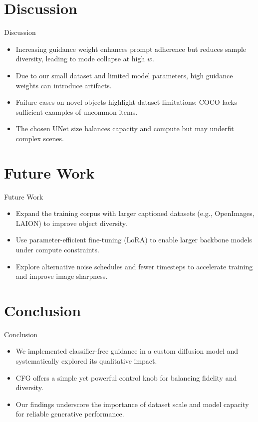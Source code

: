 \documentclass[11pt]{beamer}
\begin{document}
  \section{Discussion}
\begin{frame}{Discussion}
  \begin{itemize}
    \item Increasing guidance weight enhances prompt adherence but reduces sample diversity, leading to mode collapse at high $w$.
    \item Due to our small dataset and limited model parameters, high guidance weights can introduce artifacts.
    \item Failure cases on novel objects highlight dataset limitations: COCO lacks sufficient examples of uncommon items.
    \item The chosen UNet size balances capacity and compute but may underfit complex scenes.
  \end{itemize}
\end{frame}

\section{Future Work}
\begin{frame}{Future Work}
  \begin{itemize}
    \item Expand the training corpus with larger captioned datasets (e.g., OpenImages, LAION) to improve object diversity.
    \item Use parameter-efficient fine-tuning (LoRA) to enable larger backbone models under compute constraints.
    \item Explore alternative noise schedules and fewer timesteps to accelerate training and improve image sharpness.
  \end{itemize}
\end{frame}

\section{Conclusion}
\begin{frame}{Conclusion}
  \begin{itemize}
    \item We implemented classifier‑free guidance in a custom diffusion model and systematically explored its qualitative impact.
    \item CFG offers a simple yet powerful control knob for balancing fidelity and diversity.
    \item Our findings underscore the importance of dataset scale and model capacity for reliable generative performance.
  \end{itemize}
\end{frame}
\end{document}

